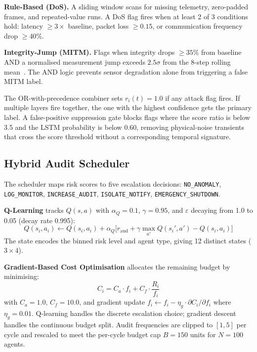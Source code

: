 \documentclass[conference,a4paper]{IEEEtran}
\begin{document}
\textbf{Rule-Based (DoS).} A sliding window scans for missing telemetry, zero-padded frames, and repeated-value runs. A DoS flag fires when at least 2 of 3 conditions hold: latency $\geq 3\times$ baseline, packet loss $\geq 0.15$, or communication frequency drop $\geq 40\%$.

\textbf{Integrity-Jump (MITM).} Flags when integrity drops $\geq 35\%$ from baseline AND a normalised measurement jump exceeds $2.5\sigma$ from the 8-step rolling mean~\cite{b4}. The AND logic prevents sensor degradation alone from triggering a false MITM label.

The OR-with-precedence combiner sets $r_i(t)=1.0$ if any attack flag fires. If multiple layers fire together, the one with the highest confidence gets the primary label. A false-positive suppression gate blocks flags where the score ratio is below 3.5 and the LSTM probability is below 0.60, removing physical-noise transients that cross the score threshold without a corresponding temporal signature.

\subsection{Hybrid Audit Scheduler}

The scheduler maps risk scores to five escalation decisions: \texttt{NO\_ANOMALY}, \texttt{LOG\_MONITOR}, \texttt{INCREASE\_AUDIT}, \texttt{ISOLATE\_NOTIFY}, \texttt{EMERGENCY\_SHUTDOWN}.

\textbf{Q-Learning} tracks $Q(s,a)$ with $\alpha_Q=0.1$, $\gamma=0.95$, and $\varepsilon$ decaying from 1.0 to 0.05 (decay rate 0.995):
\begin{equation}
Q(s_i, a_i) \leftarrow Q(s_i, a_i) + \alpha_Q\bigl[r_{\text{aud}} + \gamma \max_{a'} Q(s_i', a') - Q(s_i, a_i)\bigr]
\label{eq:qlearn}
\end{equation}
The state encodes the binned risk level and agent type, giving 12 distinct states ($3 \times 4$).

\textbf{Gradient-Based Cost Optimisation} allocates the remaining budget by minimising:
\begin{equation}
C_i = C_a \cdot f_i + C_f \cdot \frac{R_i}{f_i}
\label{eq:cost}
\end{equation}
with $C_a=1.0$, $C_f=10.0$, and gradient update $f_i \leftarrow f_i - \eta_g \cdot \partial C_i / \partial f_i$ where $\eta_g = 0.01$. Q-learning handles the discrete escalation choice; gradient descent handles the continuous budget split. Audit frequencies are clipped to $[1, 5]$ per cycle and rescaled to meet the per-cycle budget cap $B=150$ units for $N=100$ agents.
\end{document}
